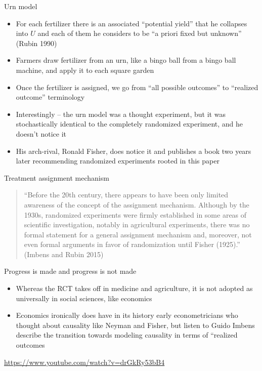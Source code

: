\documentclass{beamer}
\begin{document}
\begin{frame}{Urn model}

\begin{itemize}

\item For each fertilizer there is an associated ``potential yield'' that he collapses into $U$ and each of them he considers to be ``a priori fixed but unknown'' (Rubin 1990)
\item Farmers draw fertilizer from an urn, like a bingo ball from a bingo ball machine, and apply it to each square garden
\item Once the fertilizer is assigned, we go from ``all possible outcomes'' to ``realized outcome'' terminology
\item Interestingly -- the urn model was a thought experiment, but it was stochastically identical to the completely randomized experiment, and he doesn't notice it
\item His arch-rival, Ronald Fisher, does notice it and publishes a book two years later recommending randomized experiments rooted in this paper
\end{itemize}

\end{frame}

\begin{frame}{Treatment assignment mechanism}

\begin{quote}

``Before the 20th century, there appears to have been only limited awareness of the concept of the assignment mechanism.  Although by the 1930s, randomized experiments were firmly established in some areas of scientific investigation, notably in agricultural experiments, there was no formal statement for a general assignment mechanism and, moreover, not even formal arguments in favor of randomization until Fisher (1925).'' (Imbens and Rubin 2015)

\end{quote}

\end{frame}

\begin{frame}{Progress is made and progress is not made}

\begin{itemize}

\item Whereas the RCT takes off in medicine and agriculture, it is not adopted as universally in social sciences, like economics
\item Economics ironically does have in its history early econometricians who thought about causality like Neyman and Fisher, but listen to Guido Imbens describe the transition towards modeling causality in terms of ``realized outcomes

\end{itemize}

\bigskip

\url{https://www.youtube.com/watch?v=drGkRy53bB4}

\end{frame}
\end{document}
